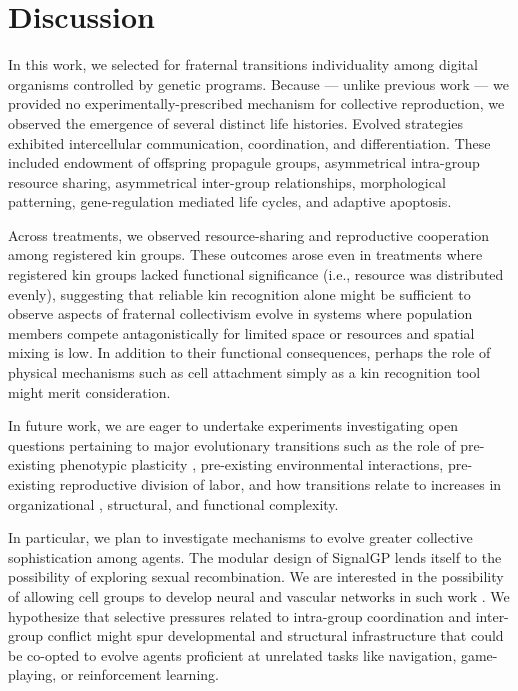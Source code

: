 \section{Discussion}


In this work, we selected for fraternal transitions individuality among digital organisms controlled by genetic programs.
Because --- unlike previous work --- we provided no experimentally-prescribed mechanism for collective reproduction, we observed the emergence of several distinct life histories.
Evolved strategies exhibited intercellular communication, coordination, and differentiation.
These included endowment of offspring propagule groups, asymmetrical intra-group resource sharing, asymmetrical inter-group relationships, morphological patterning, gene-regulation mediated life cycles, and adaptive apoptosis.

Across treatments, we observed resource-sharing and reproductive cooperation among registered kin groups.
These outcomes arose even in treatments where registered kin groups lacked functional significance (i.e., resource was distributed evenly), suggesting that reliable kin recognition alone might be sufficient to observe aspects of fraternal collectivism evolve in systems where population members compete antagonistically for limited space or resources and spatial mixing is low.
In addition to their functional consequences, perhaps the role of physical mechanisms such as cell attachment simply as a kin recognition tool might merit consideration.

In future work, we are eager to undertake experiments investigating open questions pertaining to major evolutionary transitions such as the role of pre-existing phenotypic plasticity \citep{clune2007investigating, lalejini2016evolutionary}, pre-existing environmental interactions, pre-existing reproductive division of labor, and how transitions relate to increases in organizational \citep{goldsby2012task}, structural, and functional \citep{goldsby2014evolutionary} complexity.

In particular, we plan to investigate mechanisms to evolve greater collective sophistication among agents.
The modular design of SignalGP lends itself to the possibility of exploring sexual recombination.
We are interested in the possibility of allowing cell groups to develop neural and vascular networks in such work \citep{Moreno_Ofria_2020}.
We hypothesize that selective pressures related to intra-group coordination and inter-group conflict might spur developmental and structural infrastructure that could be co-opted to evolve agents proficient at unrelated tasks like navigation, game-playing, or reinforcement learning.

